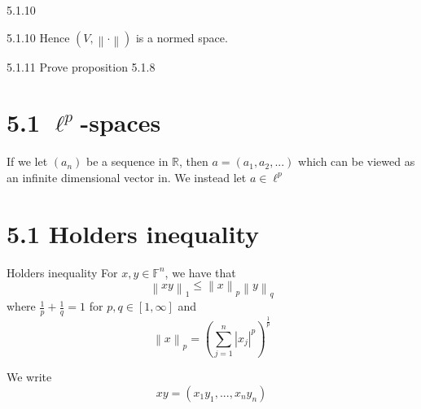 \documentclass[a4paper,norsk]{article}
\renewcommand{\leq}{\leqslant}
\begin{document}
\begin{oppgavebox}{5.1.10}{}
\begin{proofbox}{5.1.10}{}
  Hence $ \left( V, \left\lVert \cdot \right\rVert  \right)  $ is a normed space. 
\end{proofbox}
\end{oppgavebox}


\begin{oppgavebox}{5.1.11}{}
Prove proposition 5.1.8
\end{oppgavebox}


\section*{5.1 $ \ell^p $-spaces }

If we let $ \left( a_n \right)  $ be a sequence in $ \mathbb{R} $, then $ a = \left( a_1, a_2, ... \right)  $ which can be viewed as an infinite dimensional vector in. We instead let $ a \in \ell^p $  


\section*{5.1 Holders inequality}


\begin{theorembox}{Holders inequality}{}
For $ x, y \in \mathbb{F} ^{n}  $, we have that
\[
    \left\lVert xy \right\rVert _1 \leq \left\lVert x \right\rVert _p \left\lVert y \right\rVert _q
\]
where $ \frac{ 1 }{ p } + \frac{ 1 }{ q }= 1 $ for $ p, q \in \left[1, \infty \right] $   and
\[
    \left\lVert x \right\rVert _p = \left( \sum_{ j= 1}^{ n } \left| x_j \right| ^{p}   \right) ^{ \frac{ 1 }{ p }} 
\]


We write
\[
    xy = \left( x_1 y_1, ..., x_n y_n \right) 
\]



\end{theorembox}
\end{document}
